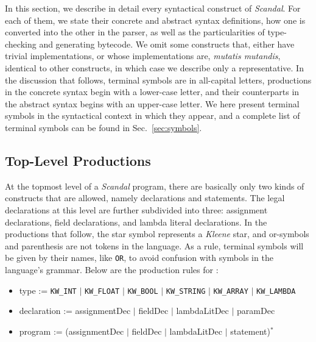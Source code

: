 In this section, we describe in detail every syntactical construct of \emph{Scandal}. For each of them, we state their concrete and abstract syntax definitions, how one is converted into the other in the parser, as well as the particularities of type-checking and generating bytecode. We omit some constructs that, either have trivial implementations, or whose implementations are, \emph{mutatis mutandis}, identical to other constructs, in which case we describe only a representative. In the discussion that follows, terminal symbols are in all-capital letters, productions in the concrete syntax begin with a lower-case letter, and their counterparts in the abstract syntax begins with an upper-case letter. We here present terminal symbols in the syntactical context in which they appear, and a complete list of terminal symbols can be found in Sec.~\ref{sec:symbols}.

\subsection{Top-Level Productions}

At the topmost level of a \emph{Scandal} program, there are basically only two kinds of constructs that are allowed, namely declarations and statements. The legal declarations at this level are further subdivided into three: assignment declarations, field declarations, and lambda literal declarations. In the productions that follow, the star symbol represents a \emph{Kleene} star, and or-symbols and parenthesis are not tokens in the language. As a rule, terminal symbols will be given by their names, like \texttt{OR}, to avoid confusion with symbols in the language's grammar. Below are the production rules for :

\begin{itemize}
	\item type := \texttt{KW\_INT} $|$ \texttt{KW\_FLOAT} $|$ \texttt{KW\_BOOL} $|$ \texttt{KW\_STRING} $|$ \texttt{KW\_ARRAY} $|$ \texttt{KW\_LAMBDA}
	\item declaration := assignmentDec $|$ fieldDec $|$ lambdaLitDec $|$ paramDec
	\item program := (assignmentDec $|$ fieldDec $|$ lambdaLitDec $|$ statement)$^*$
\end{itemize}

